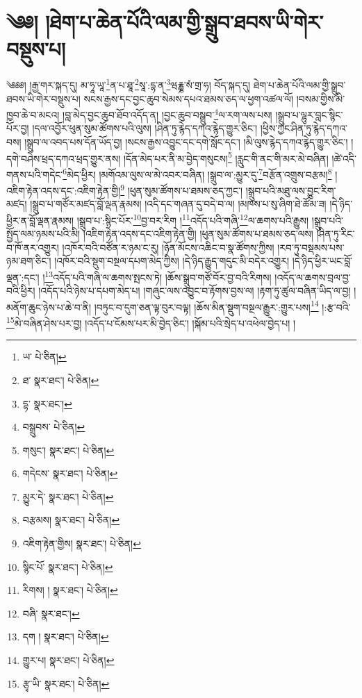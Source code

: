 \setcounter{footnote}{0} 
\chapter{༄༅། །ཐེག་པ་ཆེན་པོའི་ལམ་གྱི་སྒྲུབ་ཐབས་ཡི་གེར་བསྡུས་པ།}༄༅༅། །རྒྱ་གར་སྐད་དུ། མ་ཧཱ་ཡཱ་\footnote{ཡ་  པེ་ཅིན། }ན་པ་ཐཱ་\footnote{ཐ་  སྣར་ཐང་།  པེ་ཅིན། }སཱ་:དྷ་ན་\footnote{དྷ་  སྣར་ཐང་། }ཝརྞྞ་སཾ་གྲ་ཧ། བོད་སྐད་དུ། ཐེག་པ་ཆེན་པོའི་ལམ་གྱི་སྒྲུབ་ཐབས་ཡི་གེར་བསྡུས་པ། སངས་རྒྱས་དང་བྱང་ཆུབ་སེམས་དཔའ་ཐམས་ཅད་ལ་ཕྱག་འཚལ་ལོ། །བསམ་གྱིས་མི་ཁྱབ་ཆེ་བ་མངའ། །བླ་མེད་བྱང་ཆུབ་ཐོབ་འདོད་ན། །བྱང་ཆུབ་བསྒྲུབ་\footnote{བསྒྲུབས་  པེ་ཅིན། }ལ་རག་ལས་པས། །སྒྲུབ་པ་ལྷུར་བླང་སྙིང་པོར་བྱ། །དལ་འབྱོར་ཕུན་སུམ་ཚོགས་པའི་ལུས། །ཤིན་ཏུ་རྙེད་དཀའ་རྙེད་གྱུར་ཅིང་། །ཕྱིས་ཀྱང་ཤིན་ཏུ་རྙེད་དཀའ་བས། །སྒྲུབ་ལ་འབད་པས་དོན་ཡོད་བྱ། །སངས་རྒྱས་འབྱུང་དང་དགེ་སློང་དང་། །མི་ལུས་རྙེད་དཀའ་རྙེད་གྱུར་ཅིང་། །དགེ་བཤེས་ཕྲད་དཀའ་ཕྲད་གྱུར་ནས། །དོན་མེད་པར་ནི་མ་བྱེད་གསུངས།\footnote{གསུང་།  སྣར་ཐང་།  པེ་ཅིན། } །རླུང་གི་ནང་གི་མར་མེ་བཞིན། །ཚེ་འདི་གནས་པའི་གདེང་\footnote{གདེངས་  སྣར་ཐང་།  པེ་ཅིན། }མེད་ཕྱིར། །མགོའམ་ལུས་ལ་མེ་འབར་བཞིན། །སྒྲུབ་ལ་:མྱུར་དུ་\footnote{མྱུར་དེ་  སྣར་ཐང་།  པེ་ཅིན། }བརྩོན་འགྲུས་བརྩམ།\footnote{བརྩམས།  སྣར་ཐང་།  པེ་ཅིན། } །འཇིག་རྟེན་འདས་དང་:འཇིག་རྟེན་གྱི།\footnote{འཇིག་རྟེན་གྱིས།  སྣར་ཐང་།  པེ་ཅིན། } །ཕུན་སུམ་ཚོགས་པ་ཐམས་ཅད་ཀྱང་། །སྒྲུབ་པའི་མཐུ་ལས་བྱུང་རིག་མཛད། །སྒྲུབ་པ་གཙོར་མཛད་བློ་ལྡན་རྣམས། །འདི་དང་གཞན་དུ་བདེ་བ་ལ། །མཁས་པ་སུ་ཞིག་ཐེ་ཚོམ་ཟ། །དེ་ཉིད་ཕྱིར་ན་བློ་ལྡན་རྣམས། །སྒྲུབ་པ་:སྙིང་པོར་\footnote{སྙིང་པོ་  སྣར་ཐང་།  པེ་ཅིན། }བྱ་བར་རིག །\footnote{རིགས། །  སྣར་ཐང་།  པེ་ཅིན། }འདོད་པའི་གཞི་\footnote{བཞི་  སྣར་ཐང་། }ལ་ཆགས་པའི་རྒྱུས། །སྒྲུབ་པའི་སྤྱོད་ལམ་ཉམས་པའི་མི། །འཇིག་རྟེན་འདས་དང་འཇིག་རྟེན་གྱི། །ཕུན་སུམ་ཚོགས་པ་ཐམས་ཅད་ལས། །ཤིན་ཏུ་རིང་བ་ཁོ་ནར་འགྱུར། །འཁོར་བའི་བཙོན་ར་ཉམ་ང་རུ། །ཉོན་མོངས་འཆིང་བ་སྣ་ཚོགས་ཀྱིས། །རབ་ཏུ་བསྡམས་པས་ཉམ་ཐག་ཅིང་། །འཁོར་བའི་སྡུག་བསྔལ་དཔག་མེད་ཀྱིས། །དེ་ཉིད་རྒྱུད་གདུང་མི་བདེར་འགྱུར། །དེ་ཉིད་ཕྱིར་ཡང་བློ་ལྡན་:དང་། །\footnote{དག །  སྣར་ཐང་།  པེ་ཅིན། }འདོད་པའི་གཞི་ལ་ཆགས་སྤངས་ཏེ། །ཆོས་སྒྲུབ་གཙོ་བོར་བྱ་བའི་རིགས། །འདོད་ལ་ཆགས་བྲལ་བྱ་བའི་ཕྱིར། །འདོད་པའི་ཉེས་པ་དཔག་མེད་པ། །གཞུང་ལས་འབྱུང་བ་རྟོགས་བྱས་ལ། །རྟག་ཏུ་ཚུལ་བཞིན་ཡིད་ལ་བྱ། །མནོག་ཆུང་ཉེས་པ་ཆེ་བ་ནི། །བཏུང་བ་དུག་ཅན་ལྟ་བུར་བལྟ། །ཆོས་མིན་སྡུག་བསྔལ་རྒྱུར་:གྱུར་པས།\footnote{གྱུར་པ།  སྣར་ཐང་།  པེ་ཅིན། } །:རྩ་བའི་\footnote{རྩྭ་ཡི་  སྣར་ཐང་།  པེ་ཅིན། }མེ་བཞིན་ཤེས་པར་བྱ། །འདོད་པ་ངོམས་པར་མི་བྱེད་ཅིང་། །སྐོམ་པའི་སྲེད་པ་འཕེལ་བྱེད་པ། །
